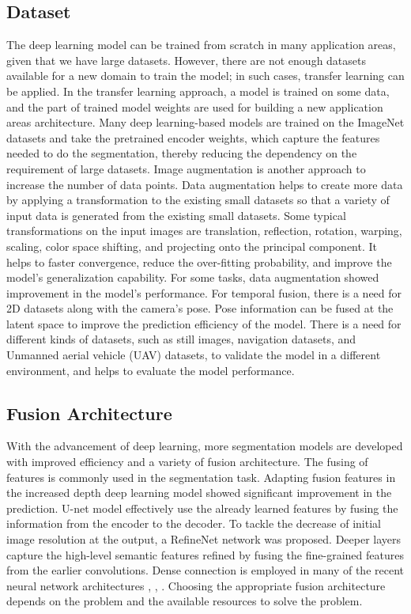 		
    \subsection{Dataset}
	
	The deep learning model can be trained from scratch in many application areas, given that we have large datasets. However, there are not enough datasets available for a new domain to train the model; in such cases, transfer learning can be applied. In the transfer learning approach, a model is trained on some data, and the part of trained model weights are used for building a new application areas architecture. Many deep learning-based models are trained on the ImageNet datasets and take the pretrained encoder weights, which capture the features needed to do the segmentation, thereby reducing the dependency on the requirement of large datasets. Image augmentation is another approach to increase the number of data points. Data augmentation helps to create more data by applying a transformation to the existing small datasets so that a variety of input data is generated from the existing small datasets. Some typical transformations on the input images are translation, reflection, rotation, warping, scaling, color space shifting, and projecting onto the principal component. It helps to faster convergence, reduce the over-fitting probability, and improve the model's generalization capability. For some tasks, data augmentation showed improvement in the model's performance. For temporal fusion, there is a need for 2D datasets along with the camera's pose. Pose information can be fused at the latent space to improve the prediction efficiency of the model. There is a need for different kinds of datasets, such as still images, navigation datasets, and Unmanned aerial vehicle (UAV) datasets, to validate the model in a different environment, and helps to evaluate the model performance.  

    \subsection{Fusion Architecture}
    
    With the advancement of deep learning, more segmentation models are developed with improved efficiency and a variety of fusion architecture. The fusing of features is commonly used in the segmentation task. Adapting fusion features in the increased depth deep learning model showed significant improvement in the prediction. U-net \cite{26_ronneberger2015u} model effectively use the already learned features by fusing the information from the encoder to the decoder. To tackle the decrease of initial image resolution at the output, a RefineNet \cite{27_lin2017refinenet} network was proposed. Deeper layers capture the high-level semantic features refined by fusing the fine-grained features from the earlier convolutions. Dense connection is employed in many of the recent neural network architectures \cite{28_jegou2017one}, \cite{29_iandola2014densenet}, \cite{30_yang2018denseaspp}. Choosing the appropriate fusion architecture depends on the problem and the available resources to solve the problem. 

